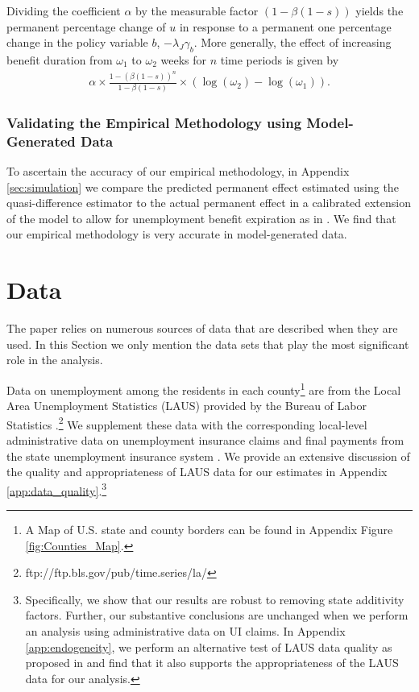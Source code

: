 \documentclass[12pt]{article}
\newcommand{\1}{\mathbf{1}}
\newcommand{\beq}{\begin{eqnarray}}
\newcommand{\eeq}{\end{eqnarray}}
\begin{document}
Dividing the coefficient $\alpha$ by the measurable factor $(1-\beta (1-s))$ yields the permanent percentage change of $u$ in response to a permanent one percentage change in the policy variable $b$, $ -  \lambda_J \gamma_b$. More generally, the effect of increasing benefit duration from $\omega_1$ to $\omega_2$ weeks for $n$ time periods is given by
\beq
\alpha \times\frac{1-(\beta(1-s))^{n}}{1-\beta(1-s)}\times\left(\log(\omega_2)-\log(\omega_1)\right). \label{eq:partial_sum}
\eeq

\subsubsection{Validating the Empirical Methodology using Model-Generated Data}

To ascertain the accuracy of our empirical methodology, in Appendix \ref{sec:simulation} we compare the predicted permanent effect estimated using the quasi-difference estimator to the actual permanent effect in a calibrated extension of the \citet{mortensen+pissarides:94} model to allow for unemployment benefit expiration as in \citet{mitman+rabinovich:15,mitman+rabinovich:24}.  We find that our empirical methodology is very accurate in model-generated data.
 


\section{Data}
\label{sec:data}

The paper relies on numerous sources of data that are described when they are used. In this Section we only mention the data sets that play the most significant role in the analysis.

Data on unemployment among the residents in each county\footnote{A Map of U.S. state and county borders can be found in Appendix Figure \ref{fig:Counties_Map}.}  are from the Local Area Unemployment Statistics (LAUS) provided by the Bureau of Labor Statistics \citep{data:bls-laus}.\footnote{ ftp://ftp.bls.gov/pub/time.series/la/} We supplement these data with the corresponding local-level administrative data on unemployment insurance claims and final payments from the state unemployment insurance system \citep{data:ui-claims}. We provide an extensive discussion of the quality and appropriateness of LAUS data for our estimates in Appendix \ref{app:data_quality}.\footnote{Specifically, we show that our results are robust to removing state additivity factors. Further, our substantive conclusions are unchanged when we perform an analysis using administrative data on UI claims. In Appendix \ref{app:endogeneity}, we perform an alternative test of LAUS data quality as proposed in \citet{hall:13} and find that it also supports the appropriateness of the LAUS data for our analysis.}
\end{document}
